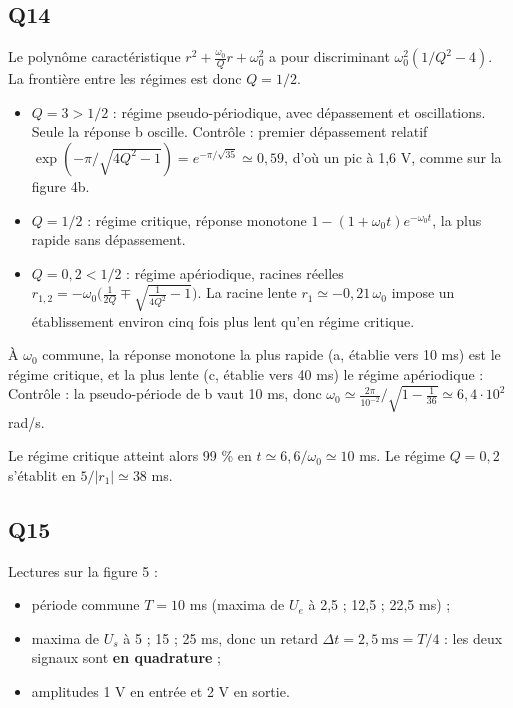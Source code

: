 \documentclass[11pt,a4paper]{article}
\providecommand{\tightlist}{\setlength{\itemsep}{0pt}\setlength{\parskip}{0pt}}
\newcommand{\equationajustee}[1]{%
  \sbox{\boiteequation}{$\displaystyle #1$}%
  \ifdim\wd\boiteequation>\linewidth
    \[\resizebox{\linewidth}{!}{\usebox{\boiteequation}}\]%
  \else
    \[#1\]%
  \fi}
\begin{document}
\hypertarget{q14}{%
\subsection{Q14}\label{q14}}

Le polynôme caractéristique \(r^2+\frac{\omega_0}Qr+\omega_0^2\) a pour discriminant \(\omega_0^2(1/Q^2-4)\). La frontière entre les régimes est donc \(Q=1/2\).

\begin{itemize}
\tightlist
\item
  \(Q=3>1/2\) : régime pseudo-périodique, avec dépassement et oscillations. Seule la réponse b oscille. Contrôle : premier dépassement relatif \(\exp(-\pi/\sqrt{4Q^2-1})=e^{-\pi/\sqrt{35}}\simeq0{,}59\), d'où un pic à 1,6 V, comme sur la figure 4b.
\item
  \(Q=1/2\) : régime critique, réponse monotone \(1-(1+\omega_0t)e^{-\omega_0t}\), la plus rapide sans dépassement.
\item
  \(Q=0{,}2<1/2\) : régime apériodique, racines réelles \(r_{1,2}=-\omega_0\big(\tfrac1{2Q}\mp\sqrt{\tfrac1{4Q^2}-1}\big)\). La racine lente \(r_1\simeq-0{,}21\,\omega_0\) impose un établissement environ cinq fois plus lent qu'en régime critique.
\end{itemize}

À \(\omega_0\) commune, la réponse monotone la plus rapide (a, établie vers 10 ms) est le régime critique, et la plus lente (c, établie vers 40 ms) le régime apériodique :
\equationajustee{\boxed{\begin{aligned}{}&\mathbf a\leftrightarrow Q=0{,}5\\
&\mathbf b\leftrightarrow Q=3\\
&\mathbf c\leftrightarrow Q=0{,}2
\end{aligned}}}
Contrôle : la pseudo-période de b vaut 10 ms, donc \(\omega_0\simeq\frac{2\pi}{10^{-2}}\big/\sqrt{1-\frac1{36}}\simeq6{,}4\cdot10^2\) rad/s.

Le régime critique atteint alors 99 \% en \(t\simeq6{,}6/\omega_0\simeq10\) ms. Le régime \(Q=0{,}2\) s'établit en \(5/|r_1|\simeq38\) ms.

\hypertarget{q15}{%
\subsection{Q15}\label{q15}}

Lectures sur la figure 5 :

\begin{itemize}
\tightlist
\item
  période commune \(T=10\) ms (maxima de \(U_e\) à 2,5 ; 12,5 ; 22,5 ms) ;
\item
  maxima de \(U_s\) à 5 ; 15 ; 25 ms, donc un retard \(\Delta t=2{,}5\ \mathrm{ms}=T/4\) : les deux signaux sont \textbf{en quadrature} ;
\item
  amplitudes 1 V en entrée et 2 V en sortie.
\end{itemize}
\end{document}
